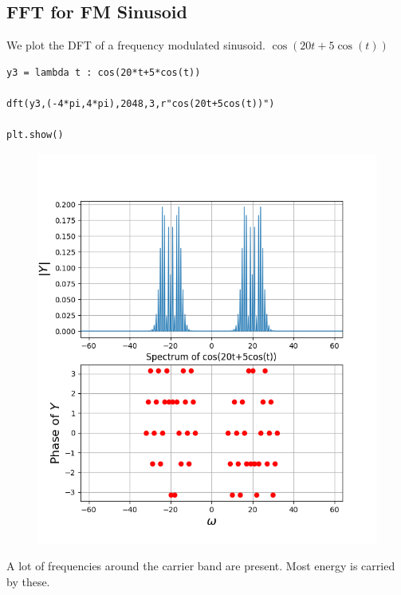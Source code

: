 \documentclass[11pt, a4paper]{article}
\begin{document}
\subsection{FFT for FM Sinusoid}
{
We plot the DFT of a frequency modulated sinusoid.
$\cos(20t+5\cos(t))$
}
\begin{verbatim}
y3 = lambda t : cos(20*t+5*cos(t))

dft(y3,(-4*pi,4*pi),2048,3,r"cos(20t+5cos(t))")

plt.show()
\end{verbatim}
\begin{figure}[!tbh]
   	\centering
   	\includegraphics[scale=0.5]{img7.png}
   	\label{fig:32}
   \end{figure}
{
A lot of frequencies around the carrier band are present.
Most energy is carried by these.
}
\end{document}
